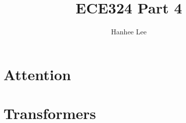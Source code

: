 \documentclass{article}
\title{ECE324 Part 4}
\author{Hanhee Lee}
\begin{document}
\section{Attention}

\newpage

\section{Transformers}

\end{document}
